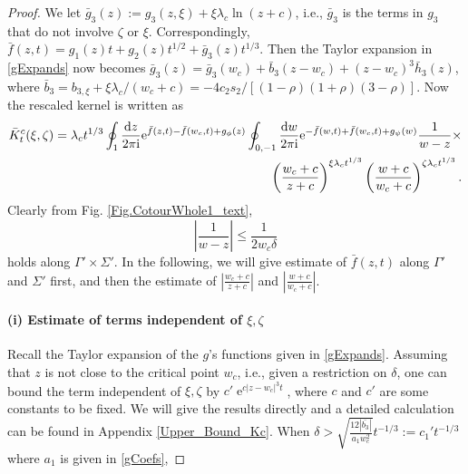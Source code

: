 \documentclass[cmp]{svjour}
\numberwithin{theorem}{section}
\numberwithin{equation}{section}
\DeclareMathOperator{\e}{e}
\def\ii{{\rm i}}
\begin{document}
\begin{proof}
We let $
\bar{g}_3(z) := g_3(z,\xi) + \xi \lambda_c \ln(z+c)$, i.e., $\bar{g}_3$ is the terms in $g_3$ that do not involve $\zeta$ or $\xi$. Correspondingly, $\bar{f}(z,t) = g_1(z) t +g_2(z) t^{1/2} + \bar{g}_3(z) t^{1/3}$. Then the Taylor expansion in \eqref{gExpands} now becomes $\bar{g}_3(z) = \bar{g}_3(w_c) + \bar{b}_3(z - w_c) + (z - w_c)^3 \bar{h}_3(z)$, where $\bar{b}_3 = b_{3,\xi} +\xi \lambda_c / (w_c +c) = - 4 c_2 s_2 / [(1 - \rho)(1 + \rho)(3 - \rho)]$. Now the rescaled kernel is written as
\begin{equation}\label{resc K suitable for asymptotics}
	\begin{split}
		\bar{K}_t^{c}(\xi , \zeta)  = \lambda_c t^{1/3} \oint_{1} \frac{\mathrm{d} z}{2 \pi \ii} \mathrm{e}^{ \bar{f}(z , t) - \bar{f}(w_c , t) + g_{\phi}(z) } \oint_{0 , -1} \frac{\mathrm{d} w}{2 \pi \ii} \mathrm{e}^{ - \bar{f}(w , t) + \bar{f}(w_c , t) + g_{\psi}(w) } \frac{1}{w-z} \times \\  
		\left(\frac{w_c+c}{z+c}\right)^{\xi \lambda_c t^{1/3}}
		\left(\frac{w+c}{w_c+c}\right)^{\zeta \lambda_c t^{1/3}}.
	\end{split}
\end{equation}
Clearly from Fig. \ref{Fig.CotourWhole1_text},  
\begin{equation}\label{wzBound}
	\left|\frac{1}{w-z}\right| \leq \frac{1}{2 w_c \delta}
\end{equation}
holds along $\Gamma' \times \Sigma'$. In the following, we will give estimate of $\bar{f}(z,t)$ along $\Gamma'$ and $\Sigma'$ first, and then the estimate of $\left| \frac{w_c+c}{z+c}\right|$ and $\left| \frac{w+c}{w_c+c}\right|$. 




\paragraph{(i) Estimate of terms independent of  $\xi,\zeta$ }

Recall the Taylor expansion of the $g$'s functions given in \eqref{gExpands}. Assuming that $z$ is not close to the critical point $w_c$, i.e., given a restriction on $\delta$, one can bound the term independent of $\xi,\zeta$ by $c'\e^{c|z-w_c|^3 t}$, where $c$ and $c'$ are some constants to be fixed. We will give the results directly and a detailed calculation can be found in Appendix \ref{Upper_Bound_Kc}. When $\delta > \sqrt{\frac{12|\bar{b_3}|}{a_1 w_c^2}} t^{-1/3} := c_1' t^{-1/3}$ where $a_1$ is given in \eqref{gCoefs}, 


\end{proof}
\end{document}
